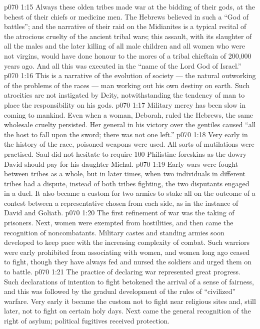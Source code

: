 \vs p070 1:15 \pc Always these olden tribes made war at the bidding of their gods, at the behest of their chiefs or medicine men. The Hebrews believed in such a “God of battles”; and the narrative of their raid on the Midianites is a typical recital of the atrocious cruelty of the ancient tribal wars; this assault, with its slaughter of all the males and the later killing of all male children and all women who were not virgins, would have done honour to the mores of a tribal chieftain of 200,000 years ago. And all this was executed in the “name of the Lord God of Israel.”
\vs p070 1:16 This is a narrative of the evolution of society --- the natural outworking of the problems of the races --- man working out his own destiny on earth. Such atrocities are not instigated by Deity, notwithstanding the tendency of man to place the responsibility on his gods.
\vs p070 1:17 \pc Military mercy has been slow in coming to mankind. Even when a woman, Deborah, ruled the Hebrews, the same wholesale cruelty persisted. Her general in his victory over the gentiles caused “all the host to fall upon the sword; there was not one left.”
\vs p070 1:18 Very early in the history of the race, poisoned weapons were used. All sorts of mutilations were practised. Saul did not hesitate to require 100 Philistine foreskins as the dowry David should pay for his daughter Michal.
\vs p070 1:19 Early wars were fought between tribes as a whole, but in later times, when two individuals in different tribes had a dispute, instead of both tribes fighting, the two disputants engaged in a duel. It also became a custom for two armies to stake all on the outcome of a contest between a representative chosen from each side, as in the instance of David and Goliath.
\vs p070 1:20 The first refinement of war was the taking of prisoners. Next, women were exempted from hostilities, and then came the recognition of noncombatants. Military castes and standing armies soon developed to keep pace with the increasing complexity of combat. Such warriors were early prohibited from associating with women, and women long ago ceased to fight, though they have always fed and nursed the soldiers and urged them on to battle.
\vs p070 1:21 The practice of declaring war represented great progress. Such declarations of intention to fight betokened the arrival of a sense of fairness, and this was followed by the gradual development of the rules of “civilized” warfare. Very early it became the custom not to fight near religious sites and, still later, not to fight on certain holy days. Next came the general recognition of the right of asylum; political fugitives received protection.
